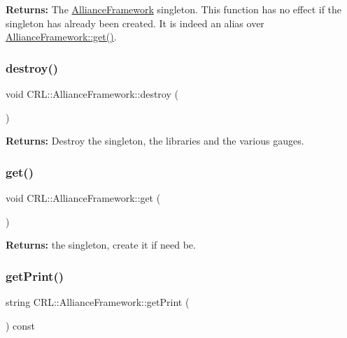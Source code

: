 {\bfseries Returns\+:} The \mbox{\hyperlink{classCRL_1_1AllianceFramework}{Alliance\+Framework}} singleton. This function has no effect if the singleton has already been created. It is indeed an alias over \mbox{\hyperlink{classCRL_1_1AllianceFramework_a976479af696a86c998c10d9d2604839d}{Alliance\+Framework\+::get()}}. \mbox{\label{classCRL_1_1AllianceFramework_a7877a201b66f2ade7621810acd842f47}} 
\subsubsection{\texorpdfstring{destroy()}{destroy()}}
{\footnotesize\ttfamily void C\+R\+L\+::\+Alliance\+Framework\+::destroy (\begin{DoxyParamCaption}{ }\end{DoxyParamCaption})}

{\bfseries Returns\+:} Destroy the singleton, the libraries and the various gauges. \mbox{\label{classCRL_1_1AllianceFramework_a976479af696a86c998c10d9d2604839d}} 
\subsubsection{\texorpdfstring{get()}{get()}}
{\footnotesize\ttfamily void C\+R\+L\+::\+Alliance\+Framework\+::get (\begin{DoxyParamCaption}{ }\end{DoxyParamCaption})\hspace{0.3cm}{\ttfamily [static]}}

{\bfseries Returns\+:} the singleton, create it if need be. \mbox{\label{classCRL_1_1AllianceFramework_ab142ba712b0e6388e45bb8d2fa05d93e}} 
\subsubsection{\texorpdfstring{get\+Print()}{getPrint()}}
{\footnotesize\ttfamily string C\+R\+L\+::\+Alliance\+Framework\+::get\+Print (\begin{DoxyParamCaption}{ }\end{DoxyParamCaption}) const}

